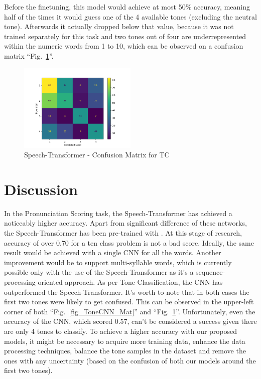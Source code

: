 \documentclass[conference]{IEEEtran}
\begin{document}
Before the finetuning, this model would achieve at most 50\% accuracy, meaning half of the times it would guess one of the 4 available tones (excluding the neutral tone).
Afterwards it actually dropped below that value, because it was not trained separately for this task and two tones out of four are underrepresented within the numeric words from 1 to 10, which can be observed on a confusion matrix ``Fig.~\ref{fig_STTC}''.

\begin{figure}[hbtp]
    \centerline{\includegraphics[width=0.5\textwidth]{Figures/Fig_STTC.png}}
    \caption{Speech-Transformer - Confusion Matrix for TC}
    \label{fig_STTC}
\end{figure}

\section{Discussion}
In the Pronunciation Scoring task, the Speech-Transformer has achieved a noticeably higher accuracy. Apart from significant difference of these networks, the Speech-Transformer has been pre-trained with \cite{shi2021aishell3multispeakermandarintts}. At this stage of research, accuracy of over 0.70 for a ten class problem is not a bad score. Ideally, the same result would be achieved with a single CNN for all the words.
Another improvement would be to support multi-syllable words, which is currently possible only with the use of the Speech-Transformer as it's a sequence-processing-oriented approach.
As per Tone Classification, the CNN has outperformed the Speech-Transformer. It's worth to note that in both cases the first two tones were likely to get confused. This can be observed in the upper-left corner of both ``Fig.~\ref{fig_ToneCNN_Mat}'' and ``Fig.~\ref{fig_STTC}''. Unfortunately, even the accuracy of the CNN, which scored 0.57, can't be considered a success given there are only 4 tones to classify. To achieve a higher accuracy with our proposed models, it might be necessary to acquire more training data, enhance the data processing techniques, balance the tone samples in the dataset and remove the ones with any uncertainty (based on the confusion of both our models around the first two tones).
\end{document}
